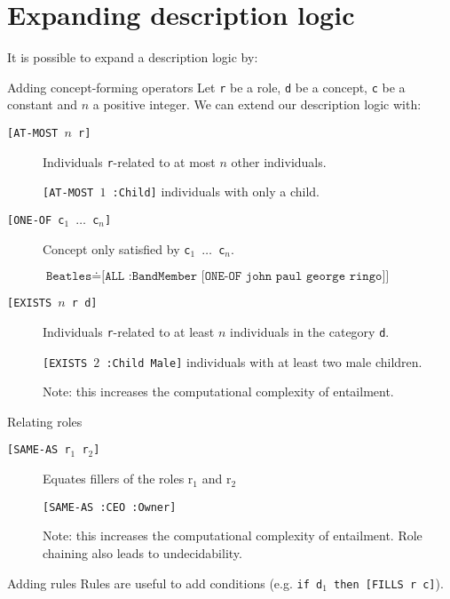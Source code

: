 \section{Expanding description logic}
It is possible to expand a description logic by:
\begin{descriptionlist}
    \item[Adding concept-forming operators] 
        Let \texttt{r} be a role, \texttt{d} be a concept, \texttt{c} be a constant and $n$ a positive integer.
        We can extend our description logic with:
        \begin{description}
            \item[\texttt{[AT-MOST $n$ r]}]
                Individuals \texttt{r}-related to at most $n$ other individuals.
                \begin{example}
                    \texttt{[AT-MOST $1$ :Child]} individuals with only a child.
                \end{example}

            \item[\texttt{[ONE-OF c$_1$ $\dots$ c$_n$]}]
                Concept only satisfied by \texttt{c$_1$ $\dots$ c$_n$}.
                \begin{example}
                    $\texttt{Beatles} \doteq \texttt{[ALL :BandMember [ONE-OF john paul george ringo]]}$
                \end{example}
                
            \item[\texttt{[EXISTS $n$ r d]}]
                Individuals \texttt{r}-related to at least $n$ individuals in the category \texttt{d}.
                \begin{example}
                    \texttt{[EXISTS $2$ :Child Male]} individuals with at least two male children.
                \end{example}
                Note: this increases the computational complexity of entailment.
        \end{description}

    \item[Relating roles] 
        \begin{description}
            \item[\texttt{[SAME-AS r$_1$ r$_2$]}]
                Equates fillers of the roles r$_1$ and r$_2$
                \begin{example}
                    \texttt{[SAME-AS :CEO :Owner]}
                \end{example}
                Note: this increases the computational complexity of entailment.
                Role chaining also leads to undecidability.
        \end{description}

    \item[Adding rules] 
        Rules are useful to add conditions (e.g. \texttt{if d$_1$ then [FILLS r c]}).
\end{descriptionlist}


